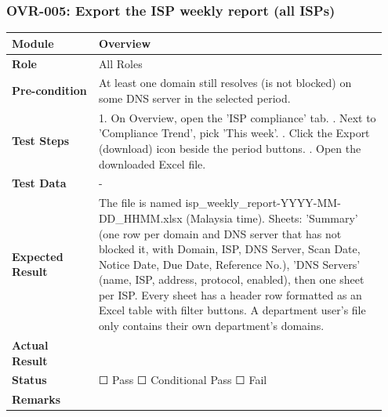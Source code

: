 \documentclass[10pt]{article}
\begin{document}
\subsubsection*{OVR-005: Export the ISP weekly report (all ISPs)}
\begin{longtable}{p{0.22\linewidth}p{0.73\linewidth}}
\hline
\textbf{Module} & Overview \\ \hline
\textbf{Role} & All Roles \\ \hline
\textbf{Pre-condition} & At least one domain still resolves (is not blocked) on some DNS server in the selected period. \\ \hline
\textbf{Test Steps} & 1. On Overview, open the 'ISP compliance' tab. \newline 2. Next to 'Compliance Trend', pick 'This week'. \newline 3. Click the Export (download) icon beside the period buttons. \newline 4. Open the downloaded Excel file. \\ \hline
\textbf{Test Data} & - \\ \hline
\textbf{Expected Result} & The file is named isp\_weekly\_report-YYYY-MM-DD\_HHMM.xlsx (Malaysia time). Sheets: 'Summary' (one row per domain and DNS server that has not blocked it, with Domain, ISP, DNS Server, Scan Date, Notice Date, Due Date, Reference No.), 'DNS Servers' (name, ISP, address, protocol, enabled), then one sheet per ISP. Every sheet has a header row formatted as an Excel table with filter buttons. A department user's file only contains their own department's domains. \\ \hline
\textbf{Actual Result} & \newline \newline \\ \hline
\textbf{Status} & ☐ Pass \quad ☐ Conditional Pass \quad ☐ Fail \\ \hline
\textbf{Remarks} & \newline \\ \hline
\end{longtable}
\end{document}
